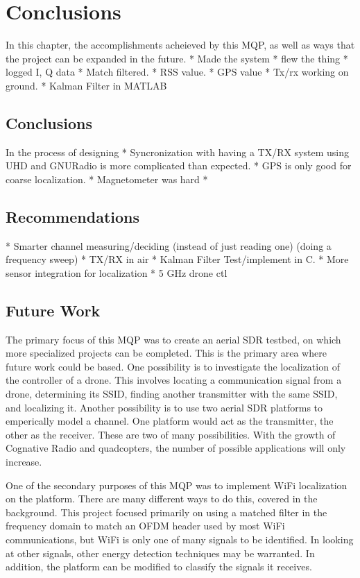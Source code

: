 \chapter{Conclusions}

In this chapter, the accomplishments acheieved by this MQP, as well as ways that 
the project can be expanded in the future. 
 * Made the system
 * flew the thing
 * logged I, Q data
 * Match filtered.
 * RSS value.
 * GPS value
 * Tx/rx working on ground.
 * Kalman Filter in MATLAB

\section{Conclusions} %
In the process of designing 
 * Syncronization with having a TX/RX system using UHD and GNURadio is more complicated than expected.
 * GPS is only good for coarse localization.
 * Magnetometer was hard
 * 

\section{Recommendations}
 * Smarter channel measuring/deciding (instead of just reading one) (doing a frequency sweep)
 * TX/RX in air
 * Kalman Filter Test/implement in C.
 * More sensor integration for localization
 * 5 GHz drone ctl


\section{Future Work}
The primary focus of this MQP was to create an aerial SDR testbed, on which more 
specialized projects can be completed. This is the primary area where future work
could be based. One possibility is to investigate the localization of the controller
of a drone. This involves locating a communication signal from a drone, determining its
SSID, finding another transmitter with the same SSID, and localizing it. Another possibility
is to use two aerial SDR platforms to emperically model a channel. One platform
would act as the transmitter, the other as the receiver. These are two of many possibilities.
With the growth of Cognative Radio and quadcopters, the number of possible applications
will only increase.\par

One of the secondary purposes of this MQP was to implement WiFi localization on 
the platform. There are many different ways to do this, covered in the background.
This project focused primarily on using a matched filter in the frequency domain to match
an OFDM header used by most WiFi communications, but WiFi is only one of many 
signals to be identified. In looking at other signals, other energy detection
techniques may be warranted. In addition, the platform can be modified to 
classify the signals it receives.\par

